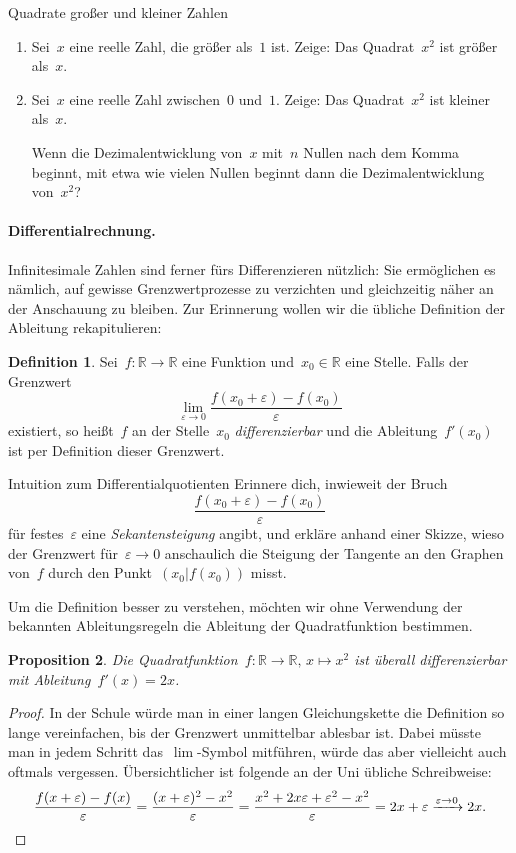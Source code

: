 \documentclass[twoside]{../zirkelblatt}
\newcommand{\RR}{\mathbb{R}}
\newcommand{\xra}[1]{\xrightarrow{#1}}
\theoremstyle{definition}
\newtheorem{defn}{Definition}[section]
\theoremstyle{plain}
\newtheorem{prop}[defn]{Proposition}
\theoremstyle{remark}
\begin{document}
\begin{aufgabeShaded}{Quadrate großer und kleiner Zahlen}
\begin{enumerate}
\item Sei~$x$ eine reelle Zahl, die größer als~$1$ ist. Zeige: Das
Quadrat~$x^2$ ist größer als~$x$.
\item Sei~$x$ eine reelle Zahl zwischen~$0$ und~$1$. Zeige: Das Quadrat~$x^2$
ist kleiner als~$x$.

Wenn die Dezimalentwicklung von~$x$ mit~$n$ Nullen nach dem Komma beginnt, mit
etwa wie vielen Nullen beginnt dann die Dezimalentwicklung von~$x^2$?
\end{enumerate}
\end{aufgabeShaded}

\paragraph{Differentialrechnung.}
Infinitesimale Zahlen sind ferner fürs Differenzieren nützlich: Sie ermöglichen
es nämlich, auf gewisse Grenzwertprozesse zu verzichten und gleichzeitig näher
an der Anschauung zu bleiben. Zur Erinnerung wollen wir die übliche Definition
der Ableitung rekapitulieren:

\begin{defn}Sei~$f : \RR \to \RR$ eine Funktion und~$x_0 \in \RR$ eine Stelle.
Falls der Grenzwert
\[ \lim_{\varepsilon \to 0} \frac{f(x_0 + \varepsilon) - f(x_0)}{\varepsilon} \]
existiert, so heißt~$f$ an der Stelle~$x_0$ \emph{differenzierbar} und die
Ableitung~$f'(x_0)$ ist per Definition dieser Grenzwert.
\end{defn}

\begin{aufgabeShaded}{Intuition zum Differentialquotienten}
Erinnere dich, inwieweit der Bruch
\[ \frac{f(x_0 + \varepsilon) - f(x_0)}{\varepsilon} \]
für festes~$\varepsilon$ eine \emph{Sekantensteigung} angibt, und erkläre anhand einer Skizze, wieso der
Grenzwert für~$\varepsilon \to 0$ anschaulich die Steigung der Tangente an den
Graphen von~$f$ durch den Punkt~$(x_0|f(x_0))$ misst.
\end{aufgabeShaded}

Um die Definition besser zu verstehen, möchten wir ohne Verwendung der bekannten
Ableitungsregeln die Ableitung der Quadratfunktion bestimmen.

\begin{prop}Die Quadratfunktion~$f : \RR \to \RR,\,x \mapsto x^2$ ist überall
differenzierbar mit Ableitung~$f'(x) = 2x$.\end{prop}
\begin{proof}In der Schule würde man in einer langen Gleichungskette die
Definition so lange vereinfachen, bis der Grenzwert unmittelbar ablesbar ist.
Dabei müsste man in jedem Schritt das~$\lim$-Symbol mitführen, würde das aber
vielleicht auch oftmals vergessen. Übersichtlicher ist folgende an der Uni
übliche Schreibweise:
\[ \frac{f(x + \varepsilon) - f(x)}{\varepsilon} =
  \frac{(x + \varepsilon)^2 - x^2}{\varepsilon} =
  \frac{x^2 + 2x\varepsilon + \varepsilon^2 - x^2}{\varepsilon} =
  2x + \varepsilon \xra{\varepsilon \to 0} 2x. \qedhere \]
\end{proof}
\end{document}
